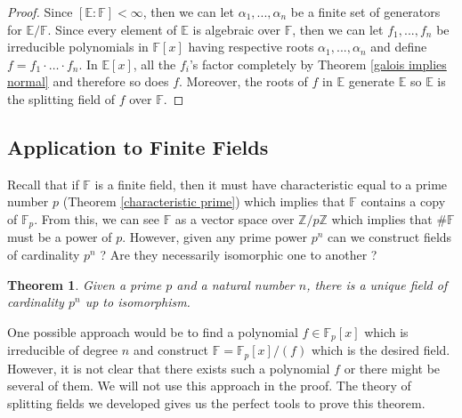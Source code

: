 \documentclass{article}
\theoremstyle{plain}
\newtheorem{theorem}{Theorem}[subsection]
\theoremstyle{definition}
\newcommand{\F}{\mathbb{F}}
\newcommand{\E}{\mathbb{E}}
\newcommand{\Zn}[1]{\mathbb{Z}/ #1 \mathbb{Z}}
\begin{document}
\begin{proof}
    Since $[\E : \F] < \infty$, then we can let $\alpha_1, ..., \alpha_n$ be a finite set of generators for $\E / \F$. Since every element of $\E$ is algebraic over $\F$, then we can let $f_1, ..., f_n$ be irreducible polynomials in $\F[x]$ having respective roots $\alpha_1, ..., \alpha_n$ and define $f = f_1 \cdot \dots \cdot f_n$. In $\E[x]$, all the $f_i$'s factor completely by Theorem \ref{galois implies normal} and therefore so does $f$. Moreover, the roots of $f$ in $\E$ generate $\E$ so $\E$ is the splitting field of $f$ over $\F$.
\end{proof}

\subsection{Application to Finite Fields} \label{application to finite fields}

Recall that if $\F$ is a finite field, then it must have characteristic equal to a prime number $p$ (Theorem \ref{characteristic prime}) which implies that $\F$ contains a copy of $\F_p$. From this, we can see $\F$ as a vector space over $\Zn{p}$ which implies that $\#\F$ must be a power of $p$. However, given any prime power $p^n$ can we construct fields of cardinality $p^n$ ? Are they necessarily isomorphic one to another ?

\begin{theorem}
    Given a prime $p$ and a natural number $n$, there is a unique field of cardinality $p^n$ up to isomorphism.
\end{theorem}

One possible approach would be to find a polynomial $f \in \F_p[x]$ which is irreducible of degree $n$ and construct $\F = \F_p[x] / (f)$ which is the desired field. However, it is not clear that there exists such a polynomial $f$ or there might be several of them. We will not use this approach in the proof. The theory of splitting fields we developed gives us the perfect tools to prove this theorem. 
\end{document}
